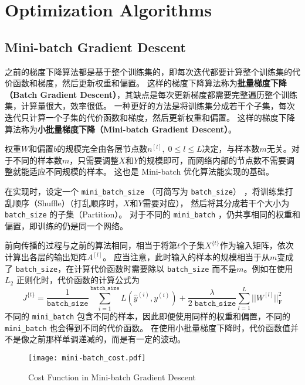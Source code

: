 \section{Optimization Algorithms}

\subsection{Mini-batch Gradient Descent}

之前的梯度下降算法都是基于整个训练集的，即每次迭代都要计算整个训练集的代价函数和梯度，然后更新权重和偏置。
这样的梯度下降算法称为\textbf{批量梯度下降（Batch Gradient Descent）}，其缺点是每次更新梯度都需要完整遍历整个训练集，计算量很大，效率很低。
一种更好的方法是将训练集分成若干个子集，每次迭代只计算一个子集的代价函数和梯度，然后更新权重和偏置。
这样的梯度下降算法称为\textbf{小批量梯度下降（Mini-batch Gradient Descent）}。

\begin{hint}
    权重$W$和偏置$b$的规模完全由各层节点数$n^{[l]},\; 0 \leqslant l \leqslant L$决定，与样本数$m$无关。对于不同的样本数$m$，只需要调整$X$和$Y$的规模即可，而网络内部的节点数不需要调整就能适应不同规模的样本。
    这也是 Mini-batch 优化算法能实现的基础。
\end{hint}

在实现时，设定一个 \verb|mini_batch_size| （可简写为 \verb|batch_size|） ，将训练集打乱顺序（Shuffle）（打乱顺序时，$X$和$Y$需要对应），
然后将其分成若干个大小为 \verb|batch_size| 的子集（Partition）。
对于不同的 \verb|mini_batch| ，仍共享相同的权重和偏置，即训练的仍是同一个网络。

前向传播的过程与之前的算法相同，相当于将第$t$个子集$X^{\{t\}}$作为输入矩阵，依次计算出各层的输出矩阵$A^{[l]}$。
应当注意，此时输入的样本的规模相当于从$m$变成了 \verb|batch_size|，在计算代价函数时需要除以 \verb|batch_size| 而不是$m$。例如在使用 $L_2$ 正则化时，代价函数的计算公式为
\begin{equation}
    J^{\{t\}} = \frac{1}{\mathtt{batch\_size}}\sum_{i=1}^\mathtt{batch\_size} L(\hat{y}^{(i)}, y^{(i)}) + \frac{\lambda}{2\;\mathtt{batch\_size}}\sum_{l=1}^L||W^{[l]}||_{\mathrm{F}}^2
\end{equation}
不同的 \verb|mini_batch| 包含不同的样本，因此即便使用同样的权重和偏置，不同的 \verb|mini_batch| 也会得到不同的代价函数。
在使用小批量梯度下降时，代价函数值并不是像之前那样单调递减的，而是有一定的波动。

\begin{figure}[h!bt]
    \centering
    \texttt{[image: mini-batch\_cost.pdf]}
    \caption{Cost Function in Mini-batch Gradient Descent}
    \label{fig:mini-batch_cost}
\end{figure}

